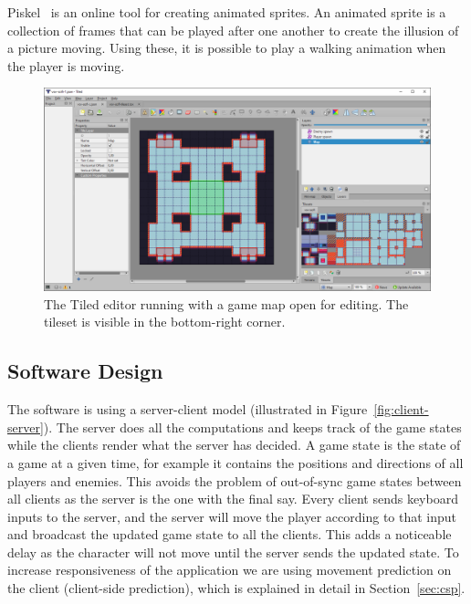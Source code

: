 \documentclass[a4paper]{article}
\begin{document}
Piskel~\cite{piskelapp} is an online tool for creating animated sprites. An animated sprite is a collection of frames that can be played after one another to create the illusion of a picture moving. Using these, it is possible to play a walking animation when the player is moving.


\begin{figure}[!hb]
    \centering
    \includegraphics[width=\linewidth]{pics/tiled.png}
    \caption{The Tiled editor running with a game map open for editing. The tileset is visible in the bottom-right corner.}
    \label{fig:tiled}
\end{figure}

\subsection{Software Design}\label{sec:softwaredesign}
The software is using a server-client model (illustrated in Figure~\ref{fig:client-server}). The server does all the computations and keeps track of the game states while the clients render what the server has decided. A game state is the state of a game at a given time, for example it contains the positions and directions of all players and enemies. This avoids the problem of out-of-sync game states between all clients as the server is the one with the final say. Every client sends keyboard inputs to the server, and the server will move the player according to that input and broadcast the updated game state to all the clients. This adds a noticeable delay as the character will not move until the server sends the updated state. To increase responsiveness of the application we are using movement prediction on the client (client-side prediction), which is explained in detail in Section~\ref{sec:csp}.
\end{document}
